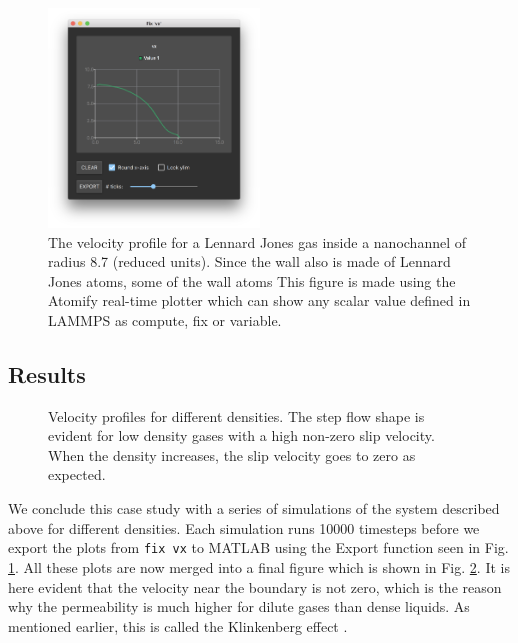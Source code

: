 \documentclass[aps,pre,twocolumn,letterpaper,floatfix,nofootinbib]{revtex4}
\newcommand{\code}[1]{\colorbox{light-gray}{\color{RawSienna}\texttt{#1}}}
\begin{document}
\begin{figure}
	\centering
	\includegraphics[width=0.5\textwidth]{lj_flow/08_velocity_profile1.png}
	\caption{
		The velocity profile for a Lennard Jones gas inside a nanochannel of radius 8.7 (reduced units).
		Since the wall also is made of Lennard Jones atoms, some of the wall atoms
		This figure is made using the Atomify real-time plotter which can show any scalar value defined in LAMMPS
		as compute, fix or variable.
    }
	\label{fig:velocity_profile1}
\end{figure}

\subsection{Results}

\begin{figure}
	\centering
	\caption{
		Velocity profiles for different densities.
		The step flow shape is evident for low density gases with a high non-zero slip velocity.
		When the density increases, the slip velocity goes to zero as expected.
    }
	\label{fig:velocity_profiles}
\end{figure}

We conclude this case study with a series of simulations of the system described above for different densities.
Each simulation runs 10000 timesteps before we export the plots from \code{fix vx} to MATLAB using the Export function seen in Fig. \ref{fig:velocity_profile1}.
All these plots are now merged into a final figure which is shown in Fig. \ref{fig:velocity_profiles}.
It is here evident that the velocity near the boundary is not zero, which is the reason why the permeability is much higher for dilute gases than dense liquids.
As mentioned earlier, this is called the Klinkenberg effect \citep{klinkenberg1941permeability}.
\end{document}
